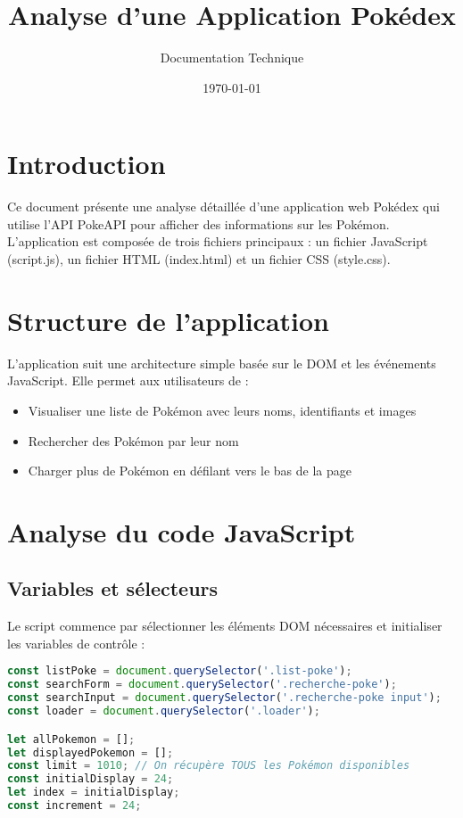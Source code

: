 \documentclass{article}
\title{Analyse d'une Application Pokédex}
\author{Documentation Technique}
\date{\today}
\begin{document}
\maketitle

\section{Introduction}
Ce document présente une analyse détaillée d'une application web Pokédex qui utilise l'API PokeAPI pour afficher des informations sur les Pokémon. L'application est composée de trois fichiers principaux : un fichier JavaScript (script.js), un fichier HTML (index.html) et un fichier CSS (style.css).

\section{Structure de l'application}
L'application suit une architecture simple basée sur le DOM et les événements JavaScript. Elle permet aux utilisateurs de :
\begin{itemize}
    \item Visualiser une liste de Pokémon avec leurs noms, identifiants et images
    \item Rechercher des Pokémon par leur nom
    \item Charger plus de Pokémon en défilant vers le bas de la page
\end{itemize}

\section{Analyse du code JavaScript}

\subsection{Variables et sélecteurs}
Le script commence par sélectionner les éléments DOM nécessaires et initialiser les variables de contrôle :

\begin{lstlisting}[language=JavaScript]
const listPoke = document.querySelector('.list-poke');
const searchForm = document.querySelector('.recherche-poke');
const searchInput = document.querySelector('.recherche-poke input');
const loader = document.querySelector('.loader');

let allPokemon = [];
let displayedPokemon = [];
const limit = 1010; // On récupère TOUS les Pokémon disponibles
const initialDisplay = 24;
let index = initialDisplay;
const increment = 24;
\end{lstlisting}
\end{document}
